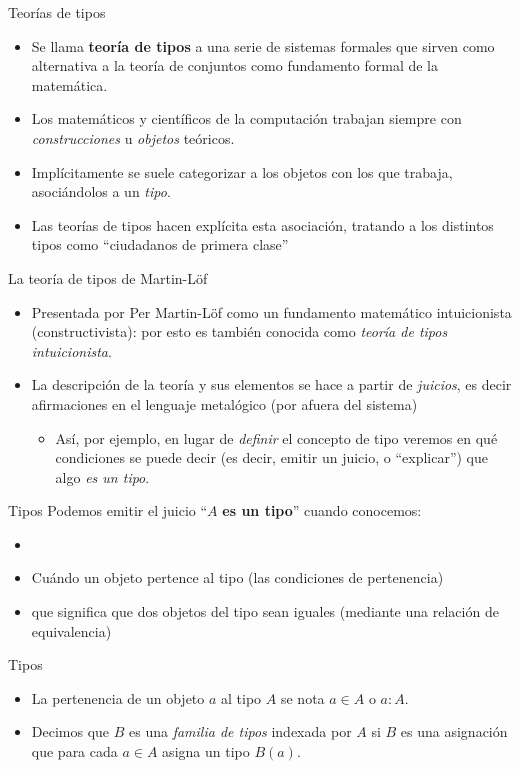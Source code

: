 \documentclass[11pt]{beamer}
\newcommand{\bit}{\begin{itemize}\setlength\itemsep{1em}}
\newcommand{\biti}{\begin{itemize}\setlength\itemsep{0.3em}}
\newcommand{\eit}{\end{itemize}}
\begin{document}
\begin{frame}{Teorías de tipos}
\bit
\item Se llama \textbf{teoría de tipos} a una serie de sistemas formales que sirven como alternativa a la teoría de conjuntos como fundamento formal de la matemática. 
\item Los matemáticos y científicos de la computación trabajan siempre con \textit{construcciones} u \textit{objetos} teóricos. 
\item Implícitamente se suele categorizar a los objetos con los que trabaja, asociándolos a un \textit{tipo}. 
\item Las teorías de tipos hacen explícita esta asociación, tratando a los distintos tipos como ``ciudadanos de primera clase''
\eit
\end{frame}

\begin{frame}{La teoría de tipos de Martin-Löf}
\bit
\item Presentada por Per Martin-Löf como un fundamento matemático intuicionista (constructivista): por esto es también conocida como \textit{teoría de tipos intuicionista}. 
\item La descripción de la teoría y sus elementos se hace a partir de \textit{juicios}, es decir afirmaciones en el lenguaje metalógico (por afuera del sistema)
\biti 
\item Así, por ejemplo, en lugar de \textit{definir} el concepto de tipo veremos en qué condiciones se puede decir (es decir, emitir un juicio, o ``explicar'') que algo \textit{es un tipo}.
\eit
\eit
\end{frame}

\begin{frame}{Tipos}
Podemos emitir el juicio ``$A$ \textbf{es un tipo}'' cuando conocemos:
\bit
\item[]
\item Cuándo un objeto pertence al tipo (las condiciones de pertenencia)
\item que significa que dos objetos del tipo sean iguales (mediante una relación de equivalencia)
\eit
\end{frame}
\begin{frame}{Tipos}
\bit
\item La pertenencia de un objeto $a$ al tipo $A$ se nota 
$a \in A$ o $a : A$.
\item Decimos que $B$ es una \textit{familia de tipos} indexada por $A$ si $B$ es una asignación que para cada $a \in A$ asigna un tipo $B(a)$. 
\eit
\end{frame}
\end{document}
